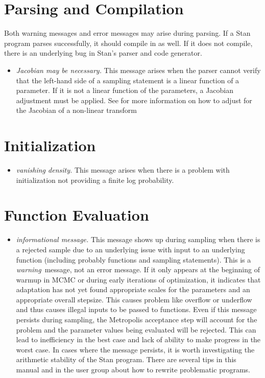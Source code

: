 \section{Parsing and Compilation}

Both warning messages and error messages may arise during parsing.  If
a Stan program parses successfully, it should compile in \Cpp as
well.  If it does not compile, there is an underlying bug in Stan's
parser and \Cpp code generator.

\begin{itemize}
\item {\it Jacobian may be necessary.}  This message arises when the
  parser cannot verify that the left-hand side of a sampling statement
  is a linear function of a parameter.  If it is not a linear function
  of the parameters, a Jacobian adjustment must be applied.  See
   for more information on how to
  adjust for the Jacobian of a non-linear transform
\end{itemize}


\section{Initialization}

\begin{itemize}
\item {\it vanishing density.} This message arises when there is a
  problem with initialization not providing a finite log probability.
%
\end{itemize}

\section{Function Evaluation}

\begin{itemize}
\item {\it informational message.}  This message shows up during
  sampling when there is a rejected sample due to an underlying issue
  with input to an underlying function (including probably functions
  and sampling statements).  This is a {\it warning}\, message, not an
  error message.  If it only appears at the beginning of warmup in
  MCMC or during early iterations of optimization, it indicates that
  adaptation has not yet found appropriate scales for the parameters
  and an appropriate overall stepsize.  This causes problem like
  overflow or underflow and thus causes illegal inputs to be passed to
  functions.  Even if this message persists during sampling, the
  Metropolis acceptance step will account for the problem and the
  parameter values being evaluated will be rejected.  This can lead to
  inefficiency in the best case and lack of ability to make progress
  in the worst case.  In cases where the message persists, it is worth
  investigating the arithmetic stability of the Stan program.  There
  are several tips in this manual and in the user group about how to
  rewrite problematic programs.
\end{itemize}


